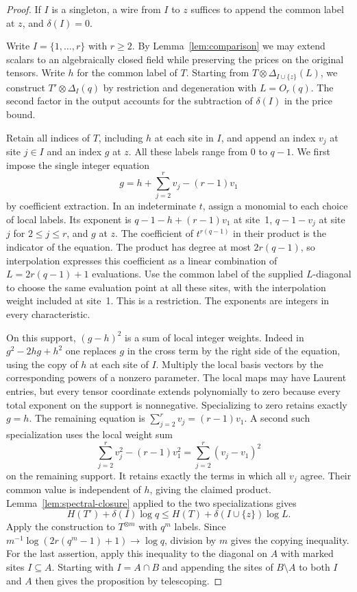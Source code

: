 \begin{proof}
If $I$ is a singleton, a wire from $I$ to $z$ suffices to append the
common label at $z$, and $\delta(I)=0$.

Write $I=\{1,\ldots,r\}$ with $r\geq2$. By
Lemma~\ref{lem:comparison} we may extend scalars to an algebraically
closed field while preserving the prices on the original tensors.
Write $h$ for the common label of $T$. Starting from
$T\otimes\Delta_{I\cup\{z\}}(L)$, we construct
$T'\otimes\Delta_I(q)$ by restriction and degeneration with
$L=O_r(q)$. The second factor in the output accounts for the
subtraction of $\delta(I)$ in the price bound.

Retain all indices of $T$, including $h$ at each site in $I$, and
append an index $v_j$ at site $j\in I$ and an index $g$ at $z$. All
these labels range from $0$ to $q-1$. We first impose the
single integer equation
\[
  g=h+\sum_{j=2}^r v_j-(r-1)v_1
\]
by coefficient extraction. In an indeterminate $t$, assign a monomial
to each choice of local labels. Its exponent is $q-1-h+(r-1)v_1$ at
site~1, $q-1-v_j$ at site $j$ for $2\le j\le r$, and $g$ at $z$.
The coefficient of $t^{r(q-1)}$ in their product is the indicator of
the equation. The product has degree at most $2r(q-1)$, so interpolation
expresses this coefficient as a linear combination of
$L=2r(q-1)+1$ evaluations. Use the common label of the supplied
$L$-diagonal to choose the same evaluation point at all these sites,
with the interpolation weight included at site~1. This is a restriction.
The exponents are integers in every characteristic.

On this support, $(g-h)^2$ is a sum of local integer weights. Indeed
in $g^2-2hg+h^2$ one replaces $g$ in the cross term by the right side
of the equation, using the copy of $h$ at each site of $I$.
Multiply the local basis vectors by the corresponding powers of a
nonzero parameter. The local maps may have Laurent entries, but every tensor
coordinate extends polynomially to zero because every total exponent on the
support is nonnegative. Specializing to zero retains exactly $g=h$. The
remaining equation is $\sum_{j=2}^r v_j=(r-1)v_1$. A second such
specialization uses the local weight sum
\[
  \sum_{j=2}^r v_j^2-(r-1)v_1^2=\sum_{j=2}^r(v_j-v_1)^2
\]
on the remaining support. It retains exactly the terms in which all
$v_j$ agree. Their common value is independent of $h$, giving the
claimed product.
Lemma~\ref{lem:spectral-closure} applied to the two specializations
gives
\[
 H(T')+\delta(I)\log q\le H(T)+\delta(I\cup\{z\})\log L .
\]
Apply the construction to $T^{\otimes m}$ with $q^m$ labels.
Since $m^{-1}\log(2r(q^m-1)+1)\to\log q$, division by $m$ gives the
copying inequality. For the last assertion, apply this inequality to
the diagonal on $A$ with marked sites $I\subseteq A$.
Starting with $I=A\cap B$ and appending the sites of $B\setminus A$
to both $I$ and $A$ then gives the proposition by telescoping.
\end{proof}


